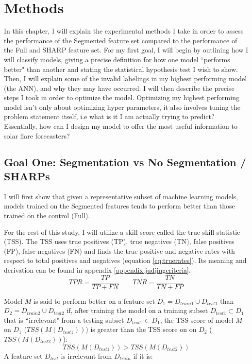 \documentclass[defaultstyle,11pt]{thesis}
\begin{document}
\chapter{Methods}
\label{chaptermethods}
In this chapter, I will explain the experimental methods I take in order to assess the performance of the Segmented feature set compared to the performance of the Full and SHARP feature set. For my first goal, I will begin by outlining how I will classify models, giving a precise definition for how one model ``performs better" than another and stating the statistical hypothesis test I wish to show. Then, I will explain some of the invalid labelings in my highest performing model (the ANN), and why they may have occurred. I will then describe the precise steps I took in order to optimize the model. Optimizing my highest performing model isn't only about optimizing hyper parameters, it also involves tuning the problem statement itself, i.e what is it I am actually trying to predict? Essentially, how can I design my model to offer the most useful information to solar flare forecasters?

\section{Goal One: Segmentation vs No Segmentation / SHARPs}
I will first show that given a representative subset of machine learning models, models trained on the Segmented features tends to perform better than those trained on the control (Full). 

For the rest of this study, I will utilize a skill score called the true skill statistic (TSS). The TSS uses true positives (TP), true negatives (TN), false positives (FP), false negatives (FN) and finds the true positive and negative rates with respect to total positives and negatives (equation \ref{eq:truerates}). Its meaning and derivation can be found in appendix \ref{appendix:judjingcriteria}. 
\begin{equation}
    TPR = \frac{TP}{TP + FN} \qquad TNR = \frac{TN}{TN + FP}
    \label{eq:truerates}
\end{equation}

Model $M$ is said to perform better on a feature set $D_1 = D_{train1} \cup D_{test1}$ than $D_2 = D_{train2} \cup D_{test2}$ if, after training the model on a training subset $D_{test1} \subset D_1$ that is ``irrelevant" from a testing subset $D_{test1} \subset D_1$, the TSS score of model $M$ on $D_1$ ($TSS(M(D_{test1}))$) is greater than the TSS score on on $D_2$ ($TSS(M(D_{test2}))$):
$$TSS(M(D_{test1})) > TSS(M(D_{test2}))$$
A feature set $D_{test}$ is irrelevant from $D_{train}$ if it is:
\end{document}
